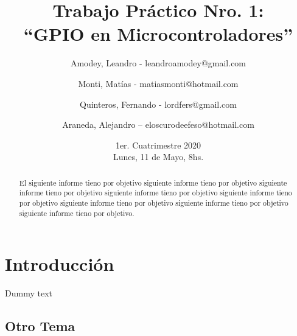 \documentclass{article}
\title{Trabajo Práctico Nro. 1:\\“GPIO en Microcontroladores”}
\author{Amodey, Leandro - leandroamodey@gmail.com
\and Monti, Matías - matiasmonti@hotmail.com
\and Quinteros, Fernando - lordfers@gmail.com
\and Araneda, Alejandro – eloscurodeefeso@hotmail.com}
\date{1er. Cuatrimestre 2020\\Lunes, 11 de Mayo, 8hs.}
\begin{document}
\begin{titlepage}
\addtolength{\oddsidemargin}{-.5cm}
\makeatletter
{}
\makeatother
\end{titlepage}

\renewcommand{\abstractname}{Resumen}
\begin{abstract}
El siguiente informe tieno por objetivo siguiente informe tieno por objetivo siguiente informe tieno por objetivo siguiente informe tieno por objetivo siguiente informe tieno por objetivo siguiente informe tieno por objetivo siguiente informe tieno por objetivo siguiente informe tieno por objetivo.
\end{abstract}


\section{Introducción}

Dummy text

\subsection*{Otro Tema}
\end{document}
